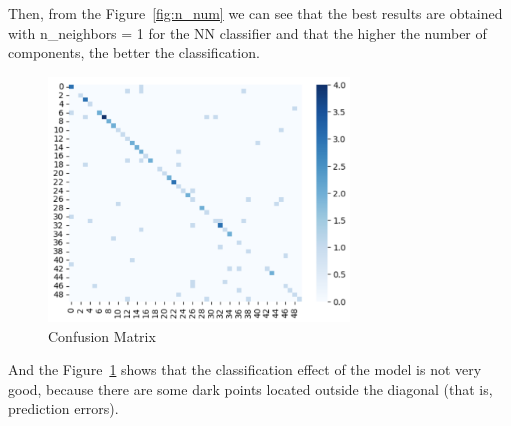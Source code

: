 Then, from the Figure~\ref{fig:n_num} we can see that the best results are obtained with n\_neighbors = 1 for the NN classifier and that the higher the number of components, the better the classification.

\begin{figure}[h]
	\centering
	\includegraphics[width=8.0cm]{./Ressources/Q1_cm.png}
	\caption{Confusion Matrix}
	\label{fig:Q1_cm}
\end{figure}
And the Figure~\ref{fig:Q1_cm} shows that the classification effect of the model is not very good, because there are some dark points located outside the diagonal (that is, prediction errors).




